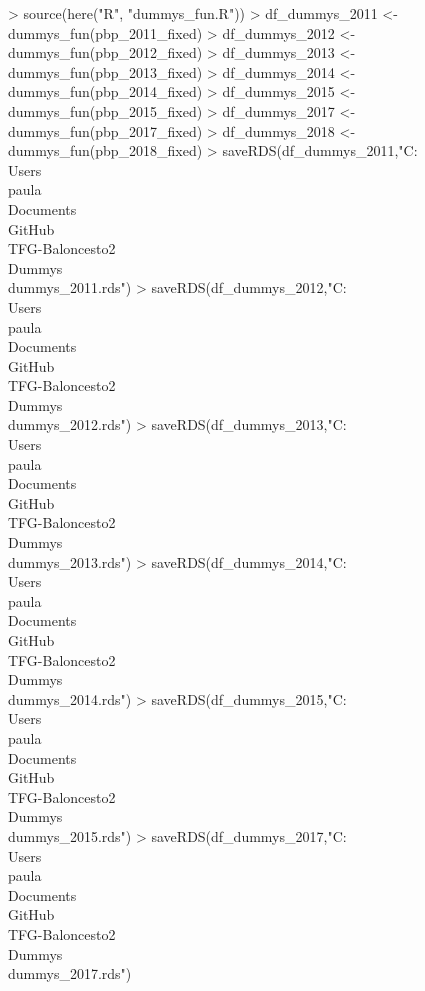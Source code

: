 \documentclass[paper=a4, fontsize=9pt]{article}
\begin{document}
\begin{Schunk}
\begin{Sinput}
> source(here("R", "dummys_fun.R"))
> df_dummys_2011 <- dummys_fun(pbp_2011_fixed)
> df_dummys_2012 <- dummys_fun(pbp_2012_fixed)
> df_dummys_2013 <- dummys_fun(pbp_2013_fixed)
> df_dummys_2014 <- dummys_fun(pbp_2014_fixed)
> df_dummys_2015 <- dummys_fun(pbp_2015_fixed)
> df_dummys_2017 <- dummys_fun(pbp_2017_fixed)
> df_dummys_2018 <- dummys_fun(pbp_2018_fixed)
> saveRDS(df_dummys_2011,"C:\\Users\\paula\\Documents\\GitHub\\TFG-Baloncesto2\\Dummys\\dummys_2011.rds")
> saveRDS(df_dummys_2012,"C:\\Users\\paula\\Documents\\GitHub\\TFG-Baloncesto2\\Dummys\\dummys_2012.rds")
> saveRDS(df_dummys_2013,"C:\\Users\\paula\\Documents\\GitHub\\TFG-Baloncesto2\\Dummys\\dummys_2013.rds")
> saveRDS(df_dummys_2014,"C:\\Users\\paula\\Documents\\GitHub\\TFG-Baloncesto2\\Dummys\\dummys_2014.rds")
> saveRDS(df_dummys_2015,"C:\\Users\\paula\\Documents\\GitHub\\TFG-Baloncesto2\\Dummys\\dummys_2015.rds")
> saveRDS(df_dummys_2017,"C:\\Users\\paula\\Documents\\GitHub\\TFG-Baloncesto2\\Dummys\\dummys_2017.rds")

\end{Sinput}
\end{Schunk}
\end{document}

